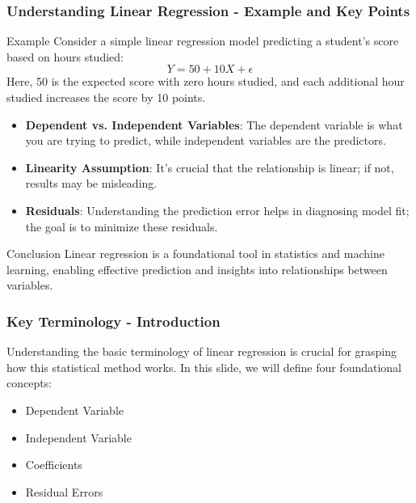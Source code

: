 \documentclass{beamer}
\begin{document}
\begin{frame}[fragile]
    \frametitle{Understanding Linear Regression - Example and Key Points}
    \begin{block}{Example}
        Consider a simple linear regression model predicting a student's score based on hours studied:
        \begin{equation}
            Y = 50 + 10X + \epsilon
        \end{equation}
        Here, 50 is the expected score with zero hours studied, and each additional hour studied increases the score by 10 points.
    \end{block}
    
    \begin{itemize}
        \item \textbf{Dependent vs. Independent Variables}: The dependent variable is what you are trying to predict, while independent variables are the predictors.
        \item \textbf{Linearity Assumption}: It's crucial that the relationship is linear; if not, results may be misleading.
        \item \textbf{Residuals}: Understanding the prediction error helps in diagnosing model fit; the goal is to minimize these residuals.
    \end{itemize}

    \begin{block}{Conclusion}
        Linear regression is a foundational tool in statistics and machine learning, enabling effective prediction and insights into relationships between variables.
    \end{block}
\end{frame}

\begin{frame}[fragile]
    \frametitle{Key Terminology - Introduction}
    Understanding the basic terminology of linear regression is crucial for grasping how this statistical method works. 
    In this slide, we will define four foundational concepts:
    \begin{itemize}
        \item Dependent Variable
        \item Independent Variable
        \item Coefficients
        \item Residual Errors
    \end{itemize}
\end{frame}
\end{document}

